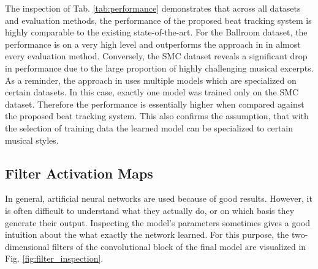\documentclass{scrartcl}
\begin{document}
The inspection of Tab. \ref{tab:performance} demonstrates that across all datasets and evaluation methods, the performance of the proposed beat tracking system is highly comparable to the existing state-of-the-art. For the Ballroom dataset, the performance is on a very high level and outperforms the approach in \cite{Boeck2014} in almost every evaluation method. Conversely, the SMC dataset reveals a significant drop in performance due to the large proportion of highly challenging musical excerpts. As a reminder, the approach in \cite{Boeck2014} uses multiple models which are specialized on certain datasets. In this case, exactly one model was trained only on the SMC dataset. Therefore the performance is essentially higher when compared against the proposed beat tracking system. This also confirms the assumption, that with the selection of training data the learned model can be specialized to certain musical styles.

\newpage


\subsection{Filter Activation Maps}
In general, artificial neural networks are used because of good results. However, it is often difficult to understand what they actually do, or on which basis they generate their output. Inspecting the model's parameters sometimes gives a good intuition about the what exactly the network learned. For this purpose, the two-dimensional filters of the convolutional block of the final model are visualized in Fig. \ref{fig:filter_inspection}.
\end{document}
